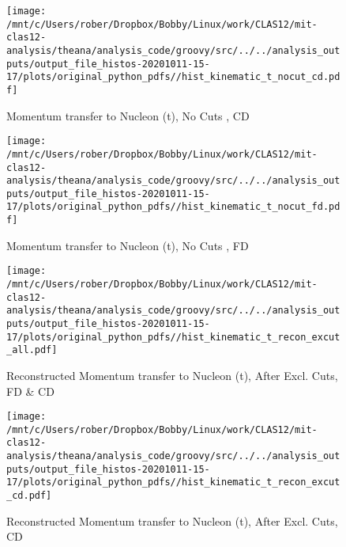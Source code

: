 \documentclass{article}
\begin{document}
\begin{landscape}
    \begin{figure}[h]
        \centering

        \texttt{[image: /mnt/c/Users/rober/Dropbox/Bobby/Linux/work/CLAS12/mit-clas12-analysis/theana/analysis\_code/groovy/src/../../analysis\_outputs/output\_file\_histos-20201011-15-17/plots/original\_python\_pdfs//hist\_kinematic\_t\_nocut\_cd.pdf]}
        \captionsetup{textformat=empty,labelformat=blank}
        \caption{Momentum transfer to Nucleon (t), No Cuts , CD}
    \end{figure}
    \clearpage
    
    \begin{figure}[h]
        \centering

        \texttt{[image: /mnt/c/Users/rober/Dropbox/Bobby/Linux/work/CLAS12/mit-clas12-analysis/theana/analysis\_code/groovy/src/../../analysis\_outputs/output\_file\_histos-20201011-15-17/plots/original\_python\_pdfs//hist\_kinematic\_t\_nocut\_fd.pdf]}
        \captionsetup{textformat=empty,labelformat=blank}
        \caption{Momentum transfer to Nucleon (t), No Cuts , FD}
    \end{figure}
    \clearpage
    
    \begin{figure}[h]
        \centering

        \texttt{[image: /mnt/c/Users/rober/Dropbox/Bobby/Linux/work/CLAS12/mit-clas12-analysis/theana/analysis\_code/groovy/src/../../analysis\_outputs/output\_file\_histos-20201011-15-17/plots/original\_python\_pdfs//hist\_kinematic\_t\_recon\_excut\_all.pdf]}
        \captionsetup{textformat=empty,labelformat=blank}
        \caption{Reconstructed Momentum transfer to Nucleon (t), After Excl. Cuts, FD \& CD}
    \end{figure}
    \clearpage
    
    \begin{figure}[h]
        \centering

        \texttt{[image: /mnt/c/Users/rober/Dropbox/Bobby/Linux/work/CLAS12/mit-clas12-analysis/theana/analysis\_code/groovy/src/../../analysis\_outputs/output\_file\_histos-20201011-15-17/plots/original\_python\_pdfs//hist\_kinematic\_t\_recon\_excut\_cd.pdf]}
        \captionsetup{textformat=empty,labelformat=blank}
        \caption{Reconstructed Momentum transfer to Nucleon (t), After Excl. Cuts, CD}
    \end{figure}
    \clearpage
    
    \begin{figure}[h]
        \centering


\end{figure}
\end{landscape}
\end{document}
